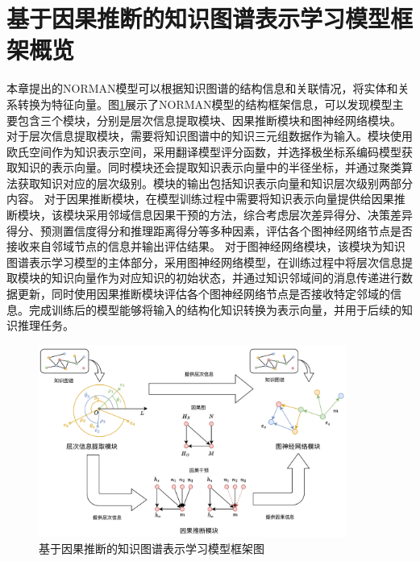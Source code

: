 \documentclass[algorithmlist, AutoFakeBold, AutoFakeSlant, figurelist, tablelist, nomlist, engineering]{seuthesix}
\begin{document}
\section{基于因果推断的知识图谱表示学习模型框架概览}
本章提出的NORMAN模型可以根据知识图谱的结构信息和关联情况，将实体和关系转换为特征向量。图\ref{2_NORMAN}展示了NORMAN模型的结构框架信息，可以发现模型主要包含三个模块，分别是层次信息提取模块、因果推断模块和图神经网络模块。
对于层次信息提取模块，需要将知识图谱中的知识三元组数据作为输入。模块使用欧氏空间作为知识表示空间，采用翻译模型评分函数，并选择极坐标系编码模型获取知识的表示向量。同时模块还会提取知识表示向量中的半径坐标，并通过聚类算法获取知识对应的层次级别。模块的输出包括知识表示向量和知识层次级别两部分内容。
对于因果推断模块，在模型训练过程中需要将知识表示向量提供给因果推断模块，该模块采用邻域信息因果干预的方法，综合考虑层次差异得分、决策差异得分、预测置信度得分和推理距离得分等多种因素，评估各个图神经网络节点是否接收来自邻域节点的信息并输出评估结果。
对于图神经网络模块，该模块为知识图谱表示学习模型的主体部分，采用图神经网络模型，在训练过程中将层次信息提取模块的知识向量作为对应知识的初始状态，并通过知识邻域间的消息传递进行数据更新，同时使用因果推断模块评估各个图神经网络节点是否接收特定邻域的信息。完成训练后的模型能够将输入的结构化知识转换为表示向量，并用于后续的知识推理任务。
\begin{figure}
  \centering
  \includegraphics[width=0.9\textwidth]{2_NORMAN}
  \caption{基于因果推断的知识图谱表示学习模型框架图}
  \label{2_NORMAN}
\end{figure}
\end{document}
